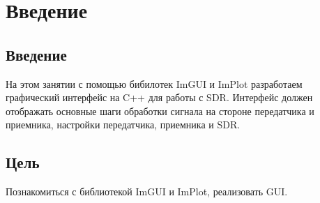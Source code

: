 \chapter{Введение}
\label{ch:intro}

\section{Введение} 

На этом занятии с помощью бибилотек ImGUI и ImPlot разработаем графический интерфейс на C++ для работы с SDR. Интерфейс должен отображать
основные шаги обработки сигнала на стороне передатчика и приемника, настройки передатчика, приемника и SDR.

\section{Цель} 
Познакомиться с библиотекой ImGUI и ImPlot, реализовать GUI.
\endinput